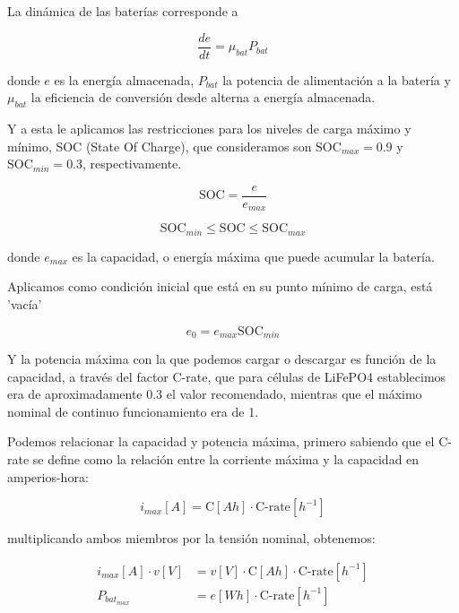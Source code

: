 La dinámica de las baterías corresponde a

\begin{equation}
	\frac{de}{dt} = \mu_{bat} P_{bat}
\end{equation}

donde $e$ es la energía almacenada, $P_{bat}$ la potencia de alimentación a la
batería y $\mu_{bat}$ la eficiencia de conversión desde alterna a energía
almacenada.

Y a esta le aplicamos las restricciones para los niveles de carga máximo y
mínimo, SOC (State Of Charge), que consideramos son $\text{SOC}_{max} = 0.9$ y
$\text{SOC}_{min} = 0.3$, respectivamente.


\begin{equation}
	\text{SOC} = \frac{e}{e_{max}}
\end{equation}

\begin{equation}
	\text{SOC}_{min} \leq \text{SOC} \leq \text{SOC}_{max}
\end{equation}

donde $e_{max}$ es la capacidad, o energía máxima que puede acumular la batería.


Aplicamos como condición inicial que está en su punto mínimo de carga,
está 'vacía'

\begin{equation}
	e_0 = e_{max} \text{SOC}_{min}
\end{equation}

Y la potencia máxima con la que podemos cargar o descargar es función de la capacidad,
a través del factor C-rate, que para células de LiFePO4 establecimos era de aproximadamente
0.3 el valor recomendado, mientras que el máximo nominal de continuo funcionamiento era de 1.

Podemos relacionar la capacidad y potencia máxima, primero sabiendo que
el C-rate se define como la relación entre la corriente máxima y la capacidad en amperios-hora:

\begin{equation}
	i_{max}[A] = \text{C}[Ah] \cdot \text{C-rate}[h^{-1}]
\end{equation}

multiplicando ambos miembros por la tensión nominal, obtenemos:

\begin{align}
	i_{max}[A] \cdot v[V] & = v[V] \cdot \text{C}[Ah] \cdot \text{C-rate}[h^{-1}] \\
	P_{bat_{max}}         & = e[Wh] \cdot \text{C-rate}[h^{-1}]
\end{align}

